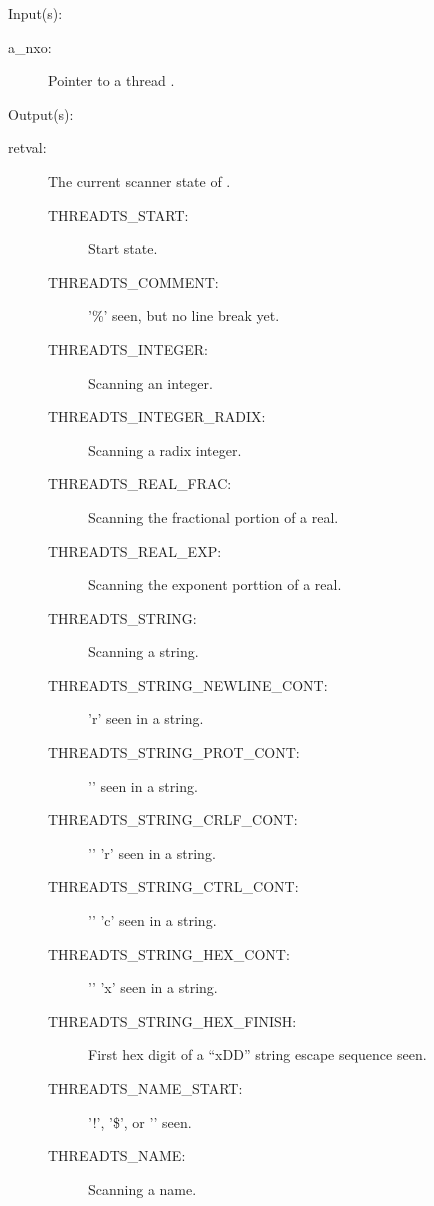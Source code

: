 \begin{capi}
	\begin{capilist}
	\item[Input(s): ]
		\begin{description}\item[]
		\item[a\_nxo: ]
			Pointer to a thread .
		\end{description}
	\item[Output(s): ]
		\begin{description}\item[]
		\item[retval: ] The current scanner state of .
			\begin{description}\item[]
			\item[THREADTS\_START: ] Start state.
			\item[THREADTS\_COMMENT: ] '\%' seen, but no line break
				yet.
			\item[THREADTS\_INTEGER: ] Scanning an integer.
			\item[THREADTS\_INTEGER\_RADIX: ] Scanning a radix
				integer.
			\item[THREADTS\_REAL\_FRAC: ] Scanning the fractional
				portion of a real.
			\item[THREADTS\_REAL\_EXP: ] Scanning the exponent
				porttion of a real.
			\item[THREADTS\_STRING: ] Scanning a string.
			\item[THREADTS\_STRING\_NEWLINE\_CONT: ] '{\bs}r' seen
				in a string.
			\item[THREADTS\_STRING\_PROT\_CONT: ] '{\bs}{\bs}' seen
				in a string.
			\item[THREADTS\_STRING\_CRLF\_CONT: ] '{\bs}' '{\bs}r'
				seen in a string.
			\item[THREADTS\_STRING\_CTRL\_CONT: ] '{\bs}' 'c' seen
				in a string.
			\item[THREADTS\_STRING\_HEX\_CONT: ] '{\bs}' 'x' seen in
				a string.
			\item[THREADTS\_STRING\_HEX\_FINISH: ] First hex digit
				of a ``{\bs}xDD'' string escape sequence seen.
			\item[THREADTS\_NAME\_START: ] '!', '\$', or '{\twid}'
				seen.
			\item[THREADTS\_NAME: ] Scanning a name.
			\end{description}
		\end{description}

\end{capilist}
\end{capi}
